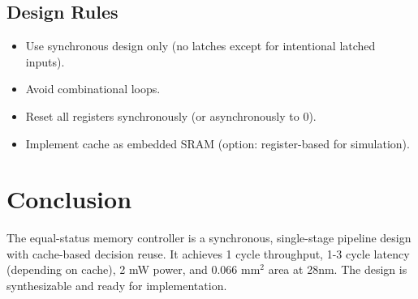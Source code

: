 \documentclass[11pt,oneside]{article}
\begin{document}
\subsection{Design Rules}

\begin{itemize}
\item Use synchronous design only (no latches except for intentional latched inputs).
\item Avoid combinational loops.
\item Reset all registers synchronously (or asynchronously to 0).
\item Implement cache as embedded SRAM (option: register-based for simulation).
\end{itemize}

\section{Conclusion}

The equal-status memory controller is a synchronous, single-stage pipeline design with cache-based decision reuse. It achieves 1 cycle throughput, 1-3 cycle latency (depending on cache), 2 mW power, and 0.066 mm$^2$ area at 28nm. The design is synthesizable and ready for implementation.
\end{document}
